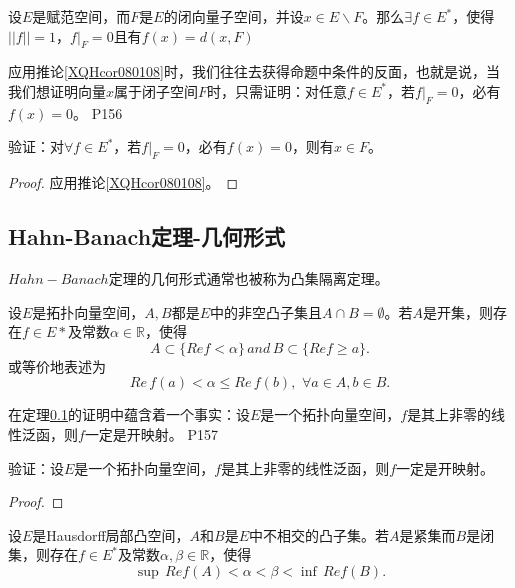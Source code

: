 \begin{corollary}\label{XQHcor080108}
	设$E$是赋范空间，而$F$是$E$的闭向量子空间，并设$x\in E \backslash F $。那么$\exists f\in E^{*} $，使得$||f||=1$，$f\big|_{F} = 0 $且有$f(x) =d(x,F) $
\end{corollary}

\original
{
	应用推论\ref{XQHcor080108}时，我们往往去获得命题中条件的反面，也就是说，当我们想证明向量$x$属于闭子空间$F$时，只需证明：对任意$f\in E^{*} $，若$f\big|_{F}=0 $，必有$f(x)=0 $。
}
{P156}

\begin{proposition}
	验证：对$\forall f\in E^{*} $，若$f\big|_{F}=0 $，必有$f(x)=0 $，则有$x\in F $。
\end{proposition}

\begin{proof}
	应用推论\ref{XQHcor080108}。
\end{proof}

\subsection{Hahn-Banach定理-几何形式}\label{XQHthe080201}
$Hahn-Banach$定理的几何形式通常也被称为凸集隔离定理。
\begin{theorem}
	设$E$是拓扑向量空间，$A,B$都是$E$中的非空凸子集且$A\cap B=\emptyset$。若$A$是开集，则存在$f\in E*$及常数$\alpha \in \mathbb{R}$，使得
	\begin{equation*}
		A\subset\{Re f<\alpha\} \, and \, B\subset\{Re f\geq a\}.
	\end{equation*}
	或等价地表述为
	\begin{equation*}
		Re\, f(a)<\alpha\leq Re\,f(b),\,\,\forall a\in A,b\in B.
	\end{equation*}
\end{theorem}

\original
{
	在定理\ref{XQHthe080201}的证明中蕴含着一个事实：设$E$是一个拓扑向量空间，$f$是其上非零的线性泛函，则$f$一定是开映射。
}
{P157}

\begin{proposition}
	验证：设$E$是一个拓扑向量空间，$f$是其上非零的线性泛函，则$f$一定是开映射。
\end{proposition}

\begin{proof}
	
\end{proof}

\begin{theorem}\label{XQHthe080202}
	设$E$是Hausdorff局部凸空间，$A$和$B$是$E$中不相交的凸子集。若$A$是紧集而$B$是闭集，则存在$f\in E^*$及常数$\alpha,\beta\in\mathbb{R}$，使得
	\begin{equation*}
		\sup\,Ref(A)<\alpha<\beta<\inf\,Re f(B).
	\end{equation*}
\end{theorem}


